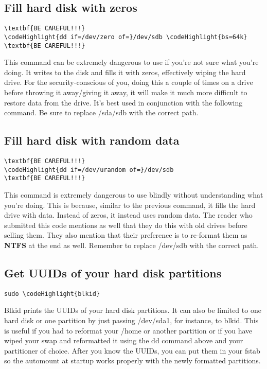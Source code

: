 \documentclass[12pt,a4paper]{article}
\begin{document}
\subsection{Fill hard disk with zeros}
\begin{Verbatim}[commandchars=\\\{\}]
\textbf{BE CAREFUL!!!}
\codeHighlight{dd if=/dev/zero of=}/dev/sdb \codeHighlight{bs=64k}
\textbf{BE CAREFUL!!!}
\end{Verbatim}
This command can be extremely dangerous to use if you're not sure what you're doing. It writes to the disk and fills it with zeros, effectively wiping the hard drive.  For the security-conscious of you, doing this a couple of times on a drive before throwing it away/giving it away, it will make it much more difficult to restore data from the drive. It's best used in conjunction with the following command. Be sure to replace /sda/sdb with the correct path.

\subsection{Fill hard disk with random data}
\begin{Verbatim}[commandchars=\\\{\}]
\textbf{BE CAREFUL!!!}
\codeHighlight{dd if=/dev/urandom of=}/dev/sdb
\textbf{BE CAREFUL!!!}
\end{Verbatim}
This command is extremely dangerous to use blindly without understanding what you're doing. This is because, similar to the previous command, it fills the hard drive with data. Instead of zeros, it instead uses random data. The reader who submitted this code mentions as well that they do this with old drives before selling them. They also mention that their preference is to re-format them as \textbf{NTFS} at the end as well.  Remember to replace /dev/sdb with the correct path.

\subsection{Get UUIDs of your hard disk partitions}
\begin{Verbatim}[commandchars=\\\{\}]
sudo \codeHighlight{blkid}
\end{Verbatim}
Blkid prints the UUIDs of your hard disk partitions. It can also be limited to one hard disk or one partition by just passing /dev/sda1, for instance, to blkid. This is useful if you had to reformat your /home or another partition or if you have wiped your swap and reformatted it using the dd command above and your partitioner of choice. After you know the UUIDs, you can put them in your fstab so the automount at startup works properly with the newly formatted partitions.
\end{document}
